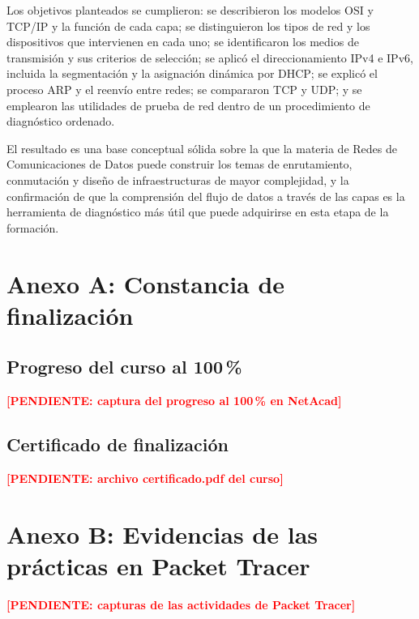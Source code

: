 \documentclass[11pt,a4paper]{article}
\newcommand{\pendiente}[1]{\textcolor{red}{\textbf{[PENDIENTE: #1]}}}
\begin{document}
Los objetivos planteados se cumplieron: se describieron los modelos OSI y
TCP/IP y la función de cada capa; se distinguieron los tipos de red y los
dispositivos que intervienen en cada uno; se identificaron los medios de
transmisión y sus criterios de selección; se aplicó el direccionamiento IPv4 e
IPv6, incluida la segmentación y la asignación dinámica por DHCP; se explicó el
proceso ARP y el reenvío entre redes; se compararon TCP y UDP; y se emplearon
las utilidades de prueba de red dentro de un procedimiento de diagnóstico
ordenado.

El resultado es una base conceptual sólida sobre la que la materia de Redes de
Comunicaciones de Datos puede construir los temas de enrutamiento, conmutación
y diseño de infraestructuras de mayor complejidad, y la confirmación de que la
comprensión del flujo de datos a través de las capas es la herramienta de
diagnóstico más útil que puede adquirirse en esta etapa de la formación.

\appendix

\section{Anexo A: Constancia de finalización}

\subsection{Progreso del curso al 100\,\%}

\pendiente{captura del progreso al 100\,\% en NetAcad}

\subsection{Certificado de finalización}

\pendiente{archivo certificado.pdf del curso}

% 

\section{Anexo B: Evidencias de las prácticas en Packet Tracer}

\pendiente{capturas de las actividades de Packet Tracer}
\end{document}
